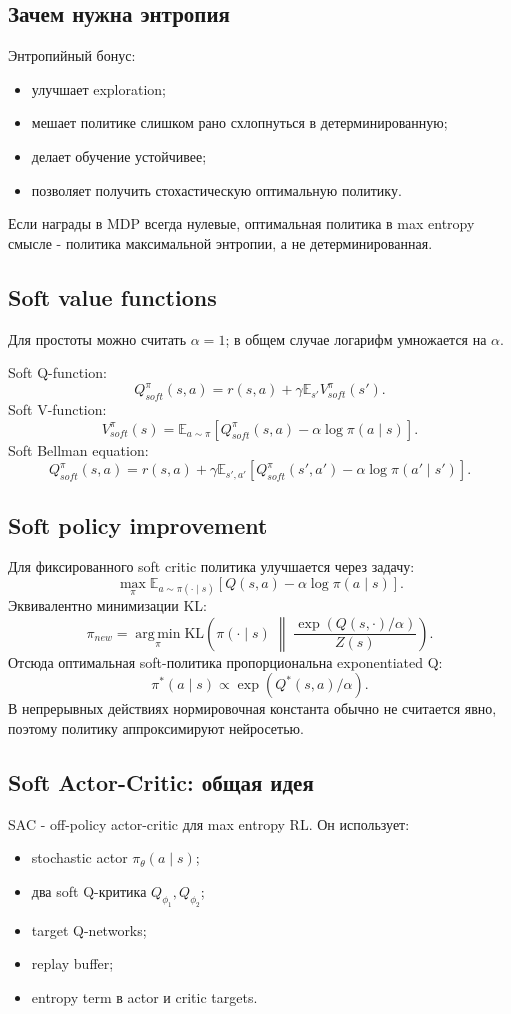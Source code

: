 \documentclass[11pt,a4paper]{article}
\newcommand{\E}{\mathbb{E}}
\newcommand{\KL}{\mathrm{KL}}
\newcommand{\argmin}{\operatorname*{arg\,min}}
\newcommand{\1}{\mathbf{1}}
\begin{document}
\subsection*{Зачем нужна энтропия}
Энтропийный бонус:
\begin{itemize}
    \item улучшает exploration;
    \item мешает политике слишком рано схлопнуться в детерминированную;
    \item делает обучение устойчивее;
    \item позволяет получить стохастическую оптимальную политику.
\end{itemize}
Если награды в MDP всегда нулевые, оптимальная политика в max entropy смысле - политика максимальной энтропии, а не детерминированная.

\subsection*{Soft value functions}
Для простоты можно считать $\alpha=1$; в общем случае логарифм умножается на $\alpha$.

Soft Q-function:
\[
    Q_{soft}^\pi(s,a)=r(s,a)+\gamma\E_{s'}V_{soft}^\pi(s').
\]
Soft V-function:
\[
    V_{soft}^\pi(s)=\E_{a\sim\pi}\left[Q_{soft}^\pi(s,a)-\alpha\log\pi(a\mid s)\right].
\]
Soft Bellman equation:
\[
    Q_{soft}^\pi(s,a)=r(s,a)+\gamma\E_{s',a'}
    \left[Q_{soft}^\pi(s',a')-\alpha\log\pi(a'\mid s')\right].
\]

\subsection*{Soft policy improvement}
Для фиксированного soft critic политика улучшается через задачу:
\[
    \max_\pi \E_{a\sim\pi(\cdot\mid s)}\left[Q(s,a)-\alpha\log\pi(a\mid s)\right].
\]
Эквивалентно минимизации KL:
\[
    \pi_{new}=\argmin_\pi \KL\left(\pi(\cdot\mid s)\;\middle\|\;\frac{\exp(Q(s,\cdot)/\alpha)}{Z(s)}\right).
\]
Отсюда оптимальная soft-политика пропорциональна exponentiated Q:
\[
    \pi^*(a\mid s)\propto \exp(Q^*(s,a)/\alpha).
\]
В непрерывных действиях нормировочная константа обычно не считается явно, поэтому политику аппроксимируют нейросетью.

\subsection*{Soft Actor-Critic: общая идея}
SAC - off-policy actor-critic для max entropy RL. Он использует:
\begin{itemize}
    \item stochastic actor $\pi_\theta(a\mid s)$;
    \item два soft Q-критика $Q_{\phi_1},Q_{\phi_2}$;
    \item target Q-networks;
    \item replay buffer;
    \item entropy term в actor и critic targets.
\end{itemize}
\end{document}

